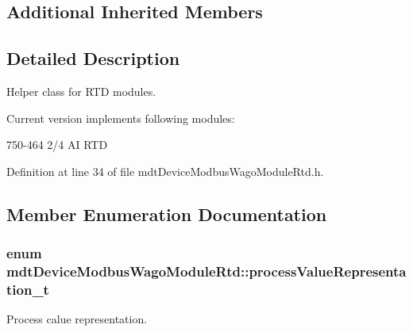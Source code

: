 \subsection*{Additional Inherited Members}


\subsection{Detailed Description}
Helper class for R\-T\-D modules. 

Current version implements following modules\-:
\begin{DoxyItemize}
\item 750-\/464 2/4 A\-I R\-T\-D 
\end{DoxyItemize}

Definition at line 34 of file mdt\-Device\-Modbus\-Wago\-Module\-Rtd.\-h.



\subsection{Member Enumeration Documentation}
\hypertarget{classmdt_device_modbus_wago_module_rtd_a6edcc72b85641ca88d66ca45a7650ca8}{
\subsubsection[{process\-Value\-Representation\-\_\-t}]{\setlength{\rightskip}{0pt plus 5cm}enum {\bf mdt\-Device\-Modbus\-Wago\-Module\-Rtd\-::process\-Value\-Representation\-\_\-t}}}\label{classmdt_device_modbus_wago_module_rtd_a6edcc72b85641ca88d66ca45a7650ca8}


Process calue representation. 

